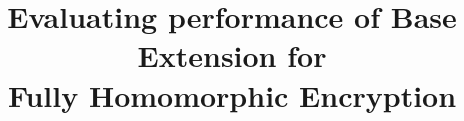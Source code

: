 \documentclass{sig-alternate}
\begin{document}
\title{Evaluating performance of Base Extension for\\Fully Homomorphic Encryption}

\date{}
\maketitle

\thispagestyle{firstpage}
\pagestyle{plain}

\begin{abstract}
    
\end{abstract}











\end{document}
